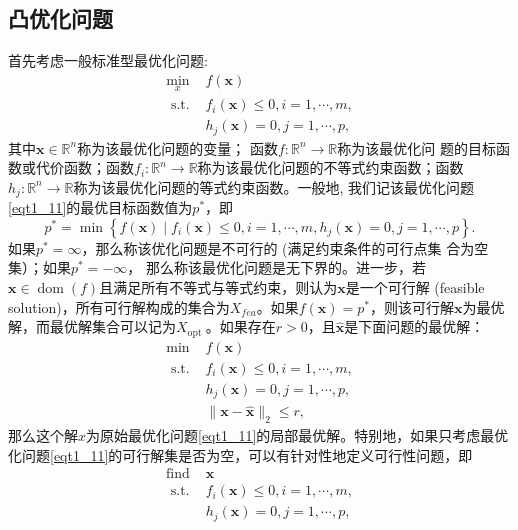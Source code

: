 \subsection{凸优化问题}
首先考虑一般标准型最优化问题:
\begin{equation}
\begin{array}{ll}
\min _{x} & f(\bm{x}) \\
\text { s.t. } & f_{i}(\bm{x}) \leq 0, i=1, \cdots, m ,\\
& h_{j}(\bm{x})=0, j=1, \cdots, p ,
\end{array}
\label{eqt1_11}
\end{equation}
其中$  \bm{x} \in \mathbb{R}^{n}  $称为该最优化问题的变量； 函数$  f: \mathbb{R}^{n} \rightarrow \mathbb{R}  $称为该最优化问 题的目标函数或代价函数；函数$ f_{i}: \mathbb{R}^{n} \rightarrow \mathbb{R}$称为该最优化问题的不等式约束函数；函数$  h_{j}: \mathbb{R}^{n} \rightarrow \mathbb{R}$称为该最优化问题的等式约束函数。一般地, 我们记该最优化问题\ref{eqt1_11}的最优目标函数值为$  p^{*} $，即
\begin{equation}
p^{*}=\min \left\{f(\bm{x}) \mid f_{i}(\bm{x}) \leq 0, i=1, \cdots, m, h_{j}(\bm{x})=0, j=1, \cdots, p\right\} .
    \nonumber
\end{equation}
如果$  p^{*}=\infty $，那么称该优化问题是不可行的 (满足约束条件的可行点集 合为空集）；如果$  p^{*}=-\infty $， 那么称该最优化问题是无下界的\cite{2004Convex}。进一步，若$  \bm{x} \in \operatorname{dom}(f)  $且满足所有不等式与等式约束，则认为$ \bm{x}  $是一个可行解 (feasible solution)，所有可行解构成的集合为$X_{f e a}$。如果$  f(\bm{x})=p^{*} $，则该可行解$  \bm{x}  $为最优解，而最优解集合可以记为$X_{\text {opt }}  $。如果存在$  r>0 $，且$  \hat{\bm{x}}  $是下面问题的最优解：
\begin{equation}
\begin{array}{ll}
\min & f(\bm{x}) \\
\text { s.t. } & f_{i}(\bm{x}) \leq 0, i=1, \cdots, m, \\
& h_{j}(\bm{x})=0, j=1, \cdots, p, \\
& \|\bm{x}-\hat{\bm{x}}\|_{2} \leq r,
\end{array}
    \nonumber
\end{equation}
那么这个解$  \hat{x}  $为原始最优化问题\ref{eqt1_11}的局部最优解。特别地，如果只考虑最优化问题\ref{eqt1_11}的可行解集是否为空，可以有针对性地定义可行性问题，即 
\begin{equation}
\begin{array}{ll}
\text{find } & \bm{x}  \\
\text { s.t. } & f_{i}(\bm{x}) \leq 0, i=1, \cdots, m ,\\
& h_{j}(\bm{x})=0, j=1, \cdots, p,
\end{array}
    \nonumber
\end{equation}

